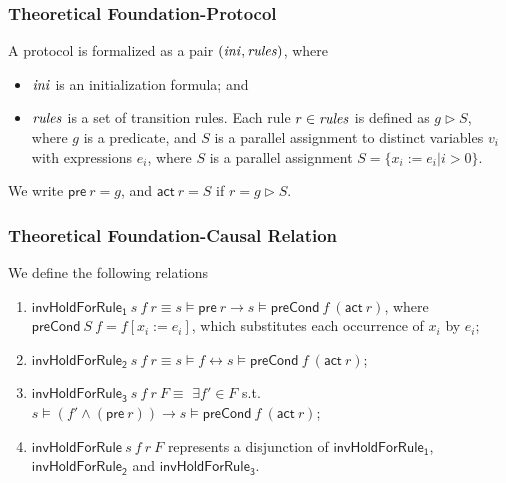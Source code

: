 \documentclass{beamer}
\begin{document}
\begin{frame}\frametitle{Theoretical Foundation-Protocol}
\noindent
A  protocol is formalized as a pair $({\it ini}, {\it rules})$, where
\begin{itemize}
\item ${\it ini}$ is an initialization formula; and
\item  ${\it rules}$ is a set of transition rules. Each rule $r\in {\it rules}$ is defined as
  $g \vartriangleright  S$, where $g$ is a predicate, and $S$ is a
  parallel assignment to distinct  variables $v_i$ with expressions
  $e_i$, where $S$ is  a parallel assignment $S=\{x_i:=e_i | i>0\}$.
\end{itemize}
We write $\mathsf{pre}~r=g$, and $\mathsf{act}~r=S$
  if $r=g \vartriangleright S$.
\end{frame}



\begin{frame}\frametitle{Theoretical Foundation-Causal Relation}



We define the following relations
\begin{enumerate}
\item $\mathsf{invHoldForRule_1}~s ~f ~r \equiv  s \models \mathsf{pre}~ r \longrightarrow s \models \mathsf{preCond}~ f ~(\mathsf{act}~ r)$, where $\mathsf{preCond}~S~f=f[x_i:=e_i]$, which substitutes each
occurrence of $x_i$ by $e_i$;
\item $\mathsf{invHoldForRule_2}~s~ f~ r \equiv  s \models f \longleftrightarrow  s \models\mathsf{preCond}~ f~(\mathsf{act}~ r)$;
\item $\mathsf{invHoldForRule_3}~s~ f~ r ~F \equiv$  $\exists f' \in F$ s.t.
$s \models (f' \wedge (\mathsf{pre}~ r)) \longrightarrow s \models \mathsf{preCond} ~f ~(\mathsf{act}   ~r)$;
\item $\mathsf{invHoldForRule}~s~ f~ r ~F$ represents a disjunction of $\mathsf{invHoldForRule_1}$, $\mathsf{invHoldForRule_2}$
and $\mathsf{invHoldForRule_3}$.
\end{enumerate}
\end{frame}
\end{document}

